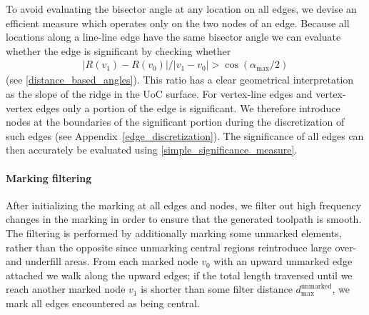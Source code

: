 
To avoid evaluating the bisector angle at any location on all edges, we devise an efficient measure which operates only on the two nodes of an edge.
Because all locations along a line-line edge have the same bisector angle we can evaluate whether the edge is significant by checking whether 
\begin{align}\label{simple_significance_measure}
| R(v_1) - R(v_0) | / |v_1 - v_0| >  \cos(\alpha_\text{max} / 2)
\end{align}
(see \cref{distance_based_angles}).
This ratio has a clear geometrical interpretation as the slope of the ridge in the UoC surface.
For vertex-line edges and vertex-vertex edges only a portion of the edge is significant.
We therefore introduce nodes at the boundaries of the significant portion during the discretization of such edges (see Appendix~\ref{edge_discretization}).
The significance of all edges can then accurately be evaluated using \cref{simple_significance_measure}.






\paragraph{Marking filtering}
After initializing the marking at all edges and nodes, we filter out high frequency changes in the marking in order to ensure that the generated toolpath is smooth. 
The filtering is performed by additionally marking some unmarked elements, rather than the opposite since unmarking central regions reintroduce large over- and underfill areas.
From each marked node $v_0$ with an upward unmarked edge attached we walk along the upward edges;
if the total length traversed until we reach another marked node $v_1$ is shorter than some filter distance $d_\text{max}^\text{unmarked}$, we mark all edges encountered as being central.














